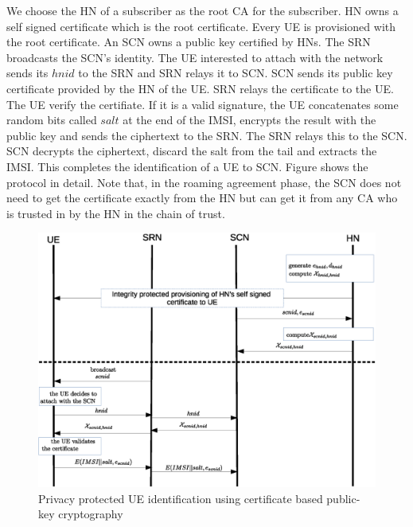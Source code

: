\documentclass[lnicst,sechang,a4paper]{svmultln}
\begin{document}
We choose the HN of a subscriber as the root CA for the subscriber. HN owns a self signed certificate which is the root certificate. Every UE is provisioned with the root certificate. An SCN owns a public key certified by HNs. The SRN broadcasts the SCN's identity. The UE interested to attach with the network sends its $hnid$ to the SRN and SRN relays it to SCN. SCN sends its public key certificate provided by the HN of the UE. SRN relays the certificate to the UE. The UE verify the certifiate. If it is a valid signature, the UE concatenates some random bits called $salt$ at the end of the IMSI, encrypts the result with the public key and sends the ciphertext to the SRN. The SRN relays this to the SCN. SCN decrypts the ciphertext, discard the salt from the tail and extracts the IMSI. This completes the identification of a UE to SCN. Figure \label{fig:protocol_public_key_variation1} shows the protocol in detail. Note that, in the roaming agreement phase, the SCN does not need to get the certificate exactly from the HN but can get it from any CA who is trusted in by the HN in the chain of trust.


\begin{figure}
\begin{center}
  \includegraphics[width=.98\textwidth]{public_key_variation1.eps}
\caption{Privacy protected UE identification using certificate based public-key cryptography}
\label{fig:solution_certificate}       %
\end{center}
\end{figure}
\end{document}
